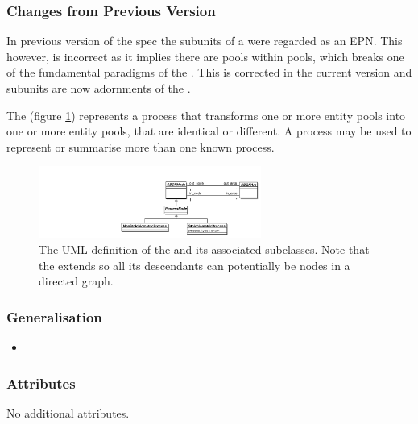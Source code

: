 \subsubsection{Changes from Previous Version}

In previous version of the spec the subunits of a 
were regarded as an EPN. This however, is incorrect as it implies
there are pools within pools, which breaks one of the fundamental
paradigms of the \PDl. This is corrected in the current version and
subunits are now adornments of the .

\label{sec:techref:PNs}
\label{defn:ProcessNode}

The  (figure \ref{fig:techref:processumlview}) represents a
process that transforms one or more entity pools into one or more
entity pools, that are identical or different. A process may be used
to represent or summarise more than one known process.

\begin{figure}[htb]
  \centering
  \includegraphics[width = 0.65\textwidth]{images/processumlview}
  \caption{The UML definition of the  and its
    associated subclasses. Note that the  extends
     so all its descendants can potentially be
    nodes in a directed graph.}
  \label{fig:techref:processumlview}
\end{figure}


\subsubsection{Generalisation}

\begin{itemize}
\item {}
\end{itemize}

\subsubsection{Attributes}

No additional attributes.

